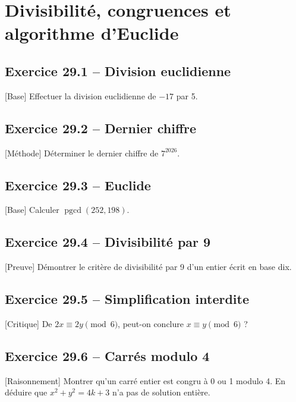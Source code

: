 \chapter{Divisibilité, congruences et algorithme d’Euclide}
\section*{Exercice 29.1 -- Division euclidienne}
[Base] Effectuer la division euclidienne de $-17$ par 5.

\section*{Exercice 29.2 -- Dernier chiffre}
[Méthode] Déterminer le dernier chiffre de $7^{2026}$.

\section*{Exercice 29.3 -- Euclide}
[Base] Calculer $\operatorname{pgcd}(252,198)$.

\section*{Exercice 29.4 -- Divisibilité par 9}
[Preuve] Démontrer le critère de divisibilité par 9 d'un entier écrit en base dix.

\section*{Exercice 29.5 -- Simplification interdite}
[Critique] De $2x\equiv2y\pmod6$, peut-on conclure $x\equiv y\pmod6$ ?

\section*{Exercice 29.6 -- Carrés modulo 4}
[Raisonnement] Montrer qu'un carré entier est congru à 0 ou 1 modulo 4. En déduire que $x^2+y^2=4k+3$ n'a pas de solution entière.
